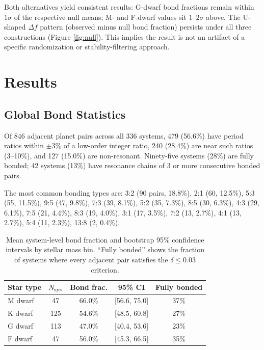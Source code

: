 \documentclass[twocolumn,usenatbib]{mnras}
\begin{document}
Both alternatives yield consistent results: G-dwarf bond fractions remain
within $1\sigma$ of the respective null means; M- and F-dwarf values sit
$1$--$2\sigma$ above. The U-shaped $\Delta f$ pattern (observed minus null
bond fraction) persists under all three constructions (Figure
\ref{fig:null}). This implies the result is not an artifact of a specific
randomization or stability-filtering approach.

\section{Results}
\label{sec:results}

\subsection{Global Bond Statistics}

Of 846 adjacent planet pairs across all 336 systems, 479 (56.6\%) have period
ratios within $\pm 3\%$ of a low-order integer ratio, 240 (28.4\%) are near
such ratios (3--10\%), and 127 (15.0\%) are non-resonant. Ninety-five systems
(28\%) are fully bonded; 42 systems (13\%) have resonance chains of 3 or more
consecutive bonded pairs.

The most common bonding types are: 3:2 (90 pairs, 18.8\%), 2:1 (60, 12.5\%),
5:3 (55, 11.5\%), 9:5 (47, 9.8\%), 7:3 (39, 8.1\%), 5:2 (35, 7.3\%),
8:5 (30, 6.3\%), 4:3 (29, 6.1\%), 7:5 (21, 4.4\%), 8:3 (19, 4.0\%),
3:1 (17, 3.5\%), 7:2 (13, 2.7\%), 4:1 (13, 2.7\%), 5:4 (11, 2.3\%),
13:8 (2, 0.4\%).

\begin{table}
\centering
\caption{Mean system-level bond fraction and bootstrap 95\% confidence
intervals by stellar mass bin. ``Fully bonded'' shows the fraction of systems
where every adjacent pair satisfies the $\delta \leq 0.03$ criterion.}
\label{tab:ushape}
\begin{tabular}{lcccc}
\hline
Star type & $N_{\rm sys}$ & Bond frac. & 95\% CI & Fully bonded\\
\hline
M dwarf & 47 & 66.0\% & [56.6, 75.0] & 37\%\\
K dwarf & 125 & 54.6\% & [48.5, 60.8] & 27\%\\
G dwarf & 113 & 47.0\% & [40.4, 53.6] & 23\%\\
F dwarf & 47 & 56.0\% & [45.3, 66.5] & 35\%\\
\hline
\end{tabular}
\end{table}
\end{document}
